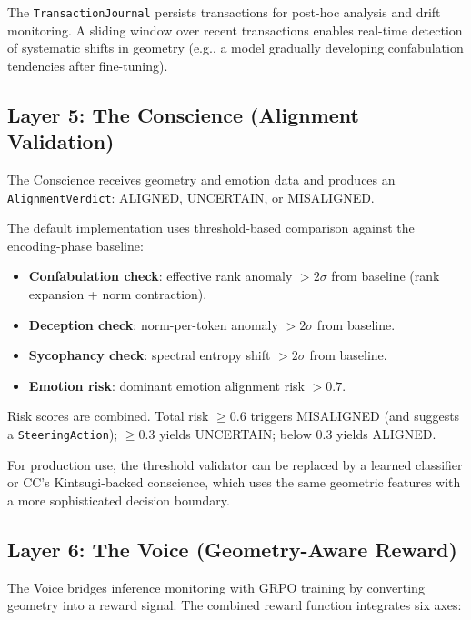 The \texttt{TransactionJournal} persists transactions for post-hoc
analysis and drift monitoring. A sliding window over recent transactions
enables real-time detection of systematic shifts in geometry (e.g., a
model gradually developing confabulation tendencies after fine-tuning).

\subsection{Layer 5: The Conscience (Alignment Validation)}

The Conscience receives geometry and emotion data and produces an
\texttt{AlignmentVerdict}: ALIGNED, UNCERTAIN, or MISALIGNED.

The default implementation uses threshold-based comparison against the
encoding-phase baseline:

\begin{itemize}[nosep]
  \item \textbf{Confabulation check}: effective rank anomaly
    $> 2\sigma$ from baseline (rank expansion + norm contraction).
  \item \textbf{Deception check}: norm-per-token anomaly
    $> 2\sigma$ from baseline.
  \item \textbf{Sycophancy check}: spectral entropy shift
    $> 2\sigma$ from baseline.
  \item \textbf{Emotion risk}: dominant emotion alignment risk
    $> 0.7$.
\end{itemize}

Risk scores are combined. Total risk $\geq 0.6$ triggers MISALIGNED
(and suggests a \texttt{SteeringAction}); $\geq 0.3$ yields UNCERTAIN;
below 0.3 yields ALIGNED.

For production use, the threshold validator can be replaced by a
learned classifier or CC's Kintsugi-backed conscience, which uses the
same geometric features with a more sophisticated decision boundary.

\subsection{Layer 6: The Voice (Geometry-Aware Reward)}

The Voice bridges inference monitoring with GRPO training by converting
geometry into a reward signal. The combined reward function integrates
six axes:

